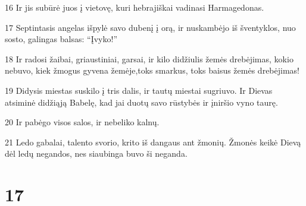 \par 16 Ir jis subūrė juos į vietovę, kuri hebrajiškai vadinasi Harmagedonas. 
\par 17 Septintasis angelas išpylė savo dubenį į orą, ir nuskambėjo iš šventyklos, nuo sosto, galingas balsas: “Įvyko!” 
\par 18 Ir radosi žaibai, griaustiniai, garsai, ir kilo didžiulis žemės drebėjimas, kokio nebuvo, kiek žmogus gyvena žemėje,­toks smarkus, toks baisus žemės drebėjimas! 
\par 19 Didysis miestas suskilo į tris dalis, ir tautų miestai sugriuvo. Ir Dievas atsiminė didžiąją Babelę, kad jai duotų savo rūstybės ir įniršio vyno taurę. 
\par 20 Ir pabėgo visos salos, ir nebeliko kalnų. 
\par 21 Ledo gabalai, talento svorio, krito iš dangaus ant žmonių. Žmonės keikė Dievą dėl ledų negandos, nes siaubinga buvo ši neganda.


\chapter{17}


